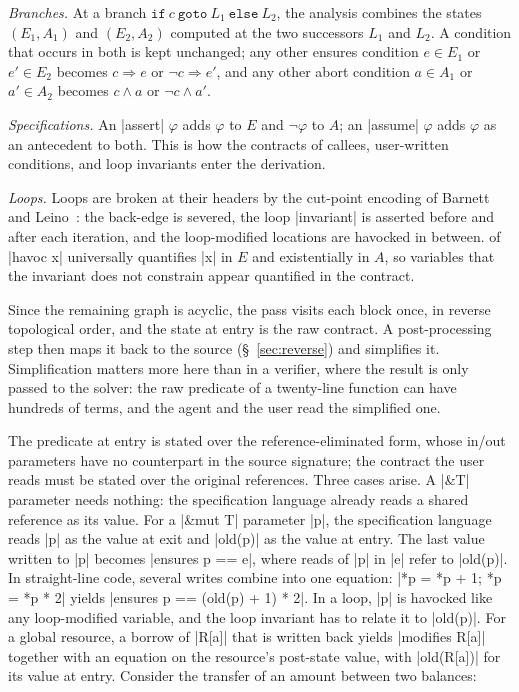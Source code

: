 \begin{Itemize}
\item \emph{Branches.}
  At a branch $\mathtt{if}\ c\ \mathtt{goto}\ L_1\ \mathtt{else}\ L_2$, the analysis combines the states $(E_1, A_1)$ and $(E_2, A_2)$ computed at the two successors $L_1$ and $L_2$.
  A condition that occurs in both is kept unchanged; any other ensures condition $e \in E_1$ or $e' \in E_2$ becomes $c \Rightarrow e$ or $\neg c \Rightarrow e'$, and any other abort condition $a \in A_1$ or $a' \in A_2$ becomes $c \wedge a$ or $\neg c \wedge a'$.
\item \emph{Specifications.}
  An |assert| $\varphi$ adds $\varphi$ to $E$ and $\neg\varphi$ to $A$; an |assume| $\varphi$ adds $\varphi$ as an antecedent to both.
  This is how the contracts of callees, user-written conditions, and loop invariants enter the derivation.
\item \emph{Loops.}
  Loops are broken at their headers by the cut-point encoding of Barnett and Leino~\cite{BL05}: the back-edge is severed, the loop |invariant| is asserted before and after each iteration, and the loop-modified locations are havocked in between.
  \WP of |havoc x| universally quantifies |x| in $E$ and existentially in $A$, so variables that the invariant does not constrain appear quantified in the contract.
\end{Itemize}
Since the remaining graph is acyclic, the pass visits each block once, in reverse topological order, and the state at entry is the raw contract.
A post-processing step then maps it back to the source (\S~\ref{sec:reverse}) and simplifies it.
Simplification matters more here than in a verifier, where the \WP result is only passed to the solver: the raw predicate of a twenty-line function can have hundreds of terms, and the agent and the user read the simplified one.

\label{sec:reverse}

The predicate at entry is stated over the reference-eliminated form, whose in/out parameters have no counterpart in the source signature; the contract the user reads must be stated over the original references.
Three cases arise.
A |&T| parameter needs nothing: the specification language already reads a shared reference as its value.
For a |&mut T| parameter |p|, the specification language reads |p| as the value at exit and |old(p)| as the value at entry. The last value written to |p| becomes |ensures p == e|, where reads of |p| in |e| refer to |old(p)|. In straight-line code, several writes combine into one equation: |*p = *p + 1; *p = *p * 2| yields |ensures p == (old(p) + 1) * 2|. In a loop, |p| is havocked like any loop-modified variable, and the loop invariant has to relate it to |old(p)|.
For a global resource, a borrow of |R[a]| that is written back yields |modifies R[a]| together with an equation on the resource's post-state value, with |old(R[a])| for its value at entry.
Consider the transfer of an amount between two balances:

